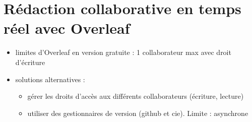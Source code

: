 \documentclass[
]{article}
\providecommand{\tightlist}{%
  \setlength{\itemsep}{0pt}\setlength{\parskip}{0pt}}
\begin{document}
\hypertarget{ruxe9daction-collaborative-en-temps-ruxe9el-avec-overleaf}{%
\section{Rédaction collaborative en temps réel avec
Overleaf}\label{ruxe9daction-collaborative-en-temps-ruxe9el-avec-overleaf}}

\begin{itemize}
\item
  limites d'Overleaf en version gratuite : 1 collaborateur max avec
  droit d'écriture
\item
  solutions alternatives :

  \begin{itemize}
  \tightlist
  \item
    gérer les droits d'accès aux différents collaborateurs (écriture,
    lecture)
  \item
    utiliser des gestionnaires de version (github et cie). Limite :
    asynchrone
  \end{itemize}
\end{itemize}

\printbibliography
\end{document}
